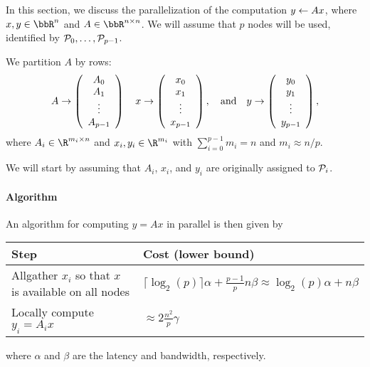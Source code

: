


In this section, we discuss the parallelization of the
computation $ y \leftarrow A x $, where $ x, y \in \Rn $ and $ A \in \Rnxn $.
We will assume that $ p $ nodes will be used, identified by $ {\cal P}_0, 
\ldots , {\cal P}_{p-1} $.

We partition $A$ by rows:
\[
A \rightarrow \left( \begin{array}{c} A_0 \\ A_1 \\ \vdots \\ A_{p-1} \end{array} \right) 
\quad
x \rightarrow \left( \begin{array}{c} x_0 \\ x_1 \\ \vdots \\ x_{p-1} \end{array} \right) ,
\quad
\mbox{and}
\quad
y \rightarrow \left( \begin{array}{c} y_0 \\ y_1 \\ \vdots \\ y_{p-1} \end{array} \right) ,
\]
where $ A_i \in \R^{m_i \times n} $ and $ x_i, y_i \in \R^{m_i} $ with
$ \sum_{i=0}^{p-1} m_i = n $ and $ m_i \approx n / p $.

We will start by assuming
that $ A_i $, $ x_i $, and $ y_i $ are originally assigned to $ {\cal P}_i $.

\paragraph*{Algorithm}

An algorithm for computing $ y = A x $ in parallel is then given by
\\[0.1in]
\begin{center}
\begin{tabular}{| p{3.5in} |  p{3.0in} |}\toprule
Step & Cost (lower bound) \\ \midrule
Allgather $ x_i $ so that $ x $ is available on all nodes & 
$ \lceil \log_2(p)\rceil \alpha + \frac{p-1}{p} n \beta \approx
\log_2(p) \alpha + n \beta $ \\
Locally compute $ y_i = A_i x $ &
$ \approx 2 \frac{n^2}{p} \gamma $ \\ \bottomrule
\end{tabular}
\end{center}
where $\alpha$ and $\beta$ are the latency and bandwidth,
respectively.

